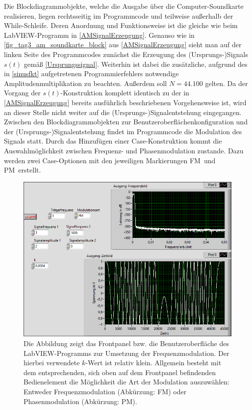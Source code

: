 \documentclass[
a4paper,
12pt,
pagesize,
ngerman
]{scrartcl}
\begin{document}
	\noindent Die Blockdiagrammobjekte, welche die Ausgabe über die Computer-Soundkarte realisieren, liegen rechtsseitig im Programmcode und teilweise außerhalb der While-Schleife. 
	Deren Anordnung und Funktionsweise ist die gleiche wie beim LabVIEW-Programm in \cref{AMSignalErzeugung}. 
	Genauso wie in \cref{fig_tag3_am_soundkarte_block} aus \cref{AMSignalErzeugung} sieht man auf der linken Seite des Programmcodes zunächst die Erzeugung des (Ursprungs-)Signals $s(t)$ gemäß \cref{Ursprungssignal}. 
	Weiterhin ist dabei die zusätzliche, aufgrund des in \cref{sinusfkt} aufgetretenen Programmierfehlers notwendige Amplitudenmultiplikation zu beachten. 
	Außerdem soll $N = 44.100$ gelten. 
	Da der Vorgang der $s(t)$-Konstruktion komplett identisch zu der in \cref{AMSignalErzeugung} bereits ausführlich beschriebenen Vorgehensweise ist, wird an dieser Stelle nicht weiter auf die (Ursprungs-)Signalentstehung eingegangen. 
	Zwischen den Blockdiagrammobjekten zur Benutzeroberflächenkonfiguration und der (Ursprungs-)Signalentstehung findet im Programmcode die Modulation des Signals statt. 
	Durch das Hinzufügen einer Case-Konstruktion kommt die Auswahlmöglichkeit zwischen Frequenz- und Phasenmodulation zustande. 
	Dazu werden zwei Case-Optionen mit den jeweiligen Markierungen \glqq FM\grqq\ und \glqq PM\grqq\ erstellt. 

	\begin{figure}[H]
		\centering
		\includegraphics[width=1.0\textwidth]{EIRE2018Dateien/Tag4/FMPM-Erzeugung/FM-FMPM-Erzeugungp}
		\caption{Die Abbildung zeigt das Frontpanel bzw. die Benutzeroberfläche des LabVIEW-Programms zur Umsetzung der Frequenzmodulation. Der hierbei verwendete $k$-Wert ist relativ klein. Allgemein besteht mit dem entsprechenden, sich oben auf dem Frontpanel befindenden Bedienelement die Möglichkeit die Art der Modulation auszuwählen: Entweder Frequenzmodulation (Abkürzung: FM) oder Phasenmodulation (Abkürzung: PM).}
		\label{FMAusgabekleinesk}
	\end{figure}
	
\end{document}
